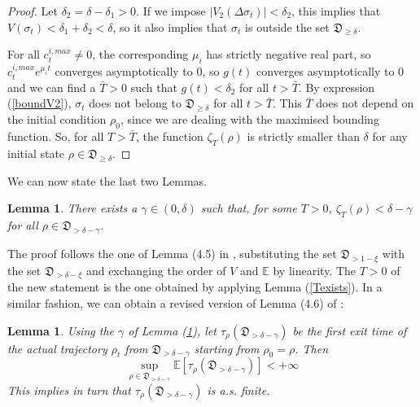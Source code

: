 \documentclass[conference]{IEEEtran}
\theoremstyle{plain}
\theoremstyle{plain}
\theoremstyle{plain}
\newtheorem{lem}[theorem]{Lemma}
\theoremstyle{plain}
\theoremstyle{remark}
\theoremstyle{definition}
\begin{document}
\begin{proof}
    Let $\delta_2 = \delta - \delta_1 > 0$. If we impose $|V_2(\Delta \sigma_t)| < \delta_2$, this implies that $V(\sigma_t) < \delta_1 + \delta_2 < \delta$, so it also implies that $\sigma_t$ is outside the set $\mathfrak D_{\ge \delta}$.

    For all $c^{i, max}_t \neq 0$, the corresponding $\mu_i$ has strictly negative real part, so  $c^{i, max}_te^{\mu_it}$ converges asymptotically to $0$, so $g(t)$ converges asymptotically to $0$ and we can find a $\bar T > 0$ such that $g(t) < \delta_2$ for all $t > \bar T$. By expression (\ref{boundV2}), $\sigma_t$ does not belong to $\mathfrak D_{\ge \delta}$ for all $t > \bar T$. This $\bar T$ does not depend on the initial condition $\rho_0$, since we are dealing with the maximised bounding function. So, for all $T > \bar T$, the function $\zeta_T(\rho)$ is strictly smaller than $\delta$ for any initial state $\rho \in \mathfrak D_{\ge \delta}$.
\end{proof}
\noindent We can now state the last two Lemmas. 
\begin{lem}
    There exists a $\gamma \in (0, \delta)$ such that, for some $T > 0$, $\zeta_T(\rho) < \delta - \gamma$ for all $\rho \in \mathfrak D_{> \delta - \gamma}$. \label{lem45mod}
\end{lem}
\noindent The proof follows the one of Lemma (4.5) in \cite{mirrahimi}, substituting the set $\mathfrak D_{> 1 - \xi}$ with the set $\mathfrak D_{> \delta - \xi}$ and exchanging the order of $V$ and $\mathbb E$ by linearity. The $T > 0$ of the new statement is the one obtained by applying Lemma (\ref{Texists}). In a similar fashion, we can obtain a revised version of Lemma (4.6) of \cite{mirrahimi}: \begin{lem}

    Using the $\gamma$ of Lemma (\ref{lem45mod}), let $\tau_{\rho}(\mathfrak D_{> \delta - \gamma})$ be the first exit time of the actual trajectory $\rho_t$ from $\mathfrak D_{> \delta - \gamma}$ starting from $\rho_0 = \rho$. Then 
    \begin{equation}
        \sup_{\rho \in \mathfrak D_{> \delta - \gamma}} \mathbb E[\tau_{\rho}(\mathfrak D_{> \delta - \gamma})] < +\infty
    \end{equation}
    This implies in turn that $\tau_\rho(\mathfrak D_{> \delta - \gamma})$ is a.s. finite.
    \label{lem46mod}
\end{lem}



\vfill
\end{document}
